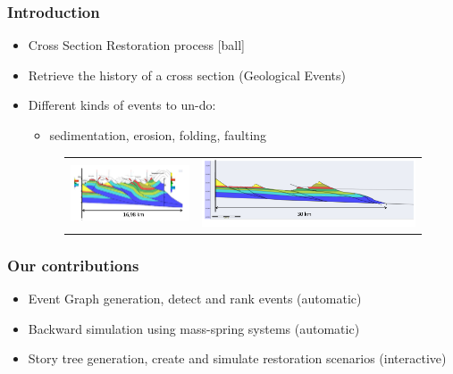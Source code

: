 \documentclass{beamer}
\begin{document}
	\begin{frame}
	\frametitle{Introduction}
	\begin{itemize}
	[ball]
	\item Cross Section Restoration process
	[ball]
	\item Retrieve the history of a cross section (Geological Events)
	\item Different kinds of events to un-do:\\ 
	\begin{itemize}
		\item sedimentation, erosion, folding, faulting
	\end{itemize}
	\begin{figure}[H]
	\centering
	\hspace*{-0.3cm}
	\begin{tabular}{@{}cc@{}}
	\includegraphics[width=.49\textwidth]{Wraped_Section.png}&
	\includegraphics[width=.48\textwidth]{UnWraped_Section.png}\\
	\end{tabular}
	\end{figure}
	\end{itemize}
	\end{frame}

	\begin{frame}
	\frametitle{Our contributions}
	\begin{itemize}
	\item Event Graph generation, detect and rank events (automatic)
	\item Backward simulation using mass-spring systems (automatic)
	\item Story tree generation, create and simulate restoration scenarios (interactive)
	\end{itemize}
    \end{frame}	
	
\end{document}
